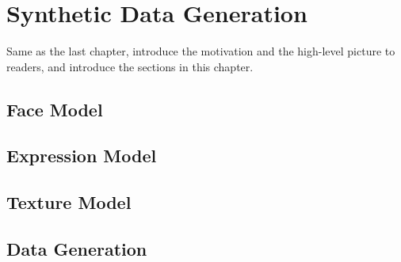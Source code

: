 \chapter{Synthetic Data Generation}
\label{cha:design}
Same as the last chapter, introduce the motivation and the high-level picture to
readers, and introduce the sections in this chapter.


\section{Face Model}
\label{sec:face}

\section{Expression Model}
\label{sec:expression}


\section{Texture Model}
\label{sec:texture}

\section{Data Generation}
\label{sec:data_generation}